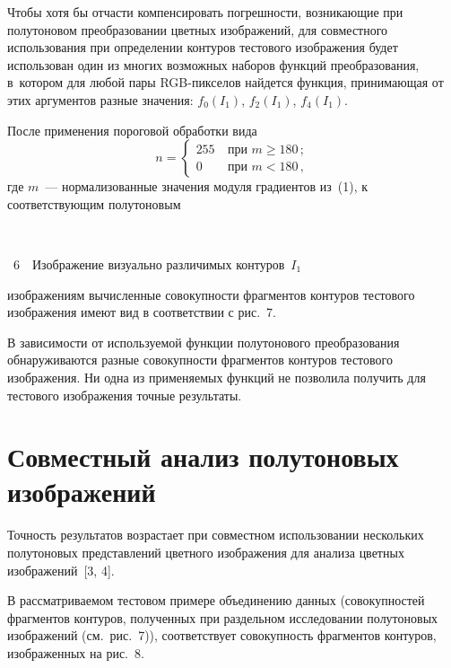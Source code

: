 \begin{multicols}{2}
  Чтобы хотя бы отчасти компенсировать погрешности, возникающие при
полутоновом преобра\-зовании цветных изображений, для совместного
использова\-ния при определении контуров тестового изображения будет
использован один из многих возможных наборов функций преобразования,
в~котором для любой пары RGB-пик\-се\-лов найдется функция, принимающая от
этих аргументов разные значения: $f_0(I_1)$, $f_2(I_1)$, $f_4(I_1)$.




  После применения пороговой обработки вида
  $$
  n = \begin{cases} 255 &\ \mbox{при } m\geq 180\,;\\
  0 &\ \mbox{при } m< 180\,,
  \end{cases}
  $$
где $m$~--- нормализованные значения модуля градиентов из~(1), к
соответствующим полутоновым\linebreak\vspace*{-12pt}
\begin{center}  %
\vspace*{8pt}
\mbox{%
\epsfxsize=78mm
}
  \vspace*{2pt}

{{\figurename~6}\ \ \small{Изображение визуально различимых контуров~$I_1$}}
  \end{center}



\noindent изображениям вычисленные совокупности
фрагментов контуров тестового изображения имеют вид в соответствии с
рис.~7.

  В зависимости от используемой функции полутонового преобразования
обнаруживаются разные совокупности фрагментов контуров тестового
изображения. Ни одна из применяемых функций не позволила получить для
тестового изображения точные результаты.



\section{Совместный анализ полутоновых изображений}

  Точность результатов возрастает при совместном использовании нескольких
полутоновых представлений цветного изображения для анализа цветных
изображений~[3, 4].

  В рассматриваемом тестовом примере объединению данных (совокупностей
фрагментов контуров, полученных при раздельном исследовании полутоновых
изображений (см.\ рис.~7)), соответствует совокупность фрагментов контуров,
изображенных на рис.~8.




\end{multicols}
